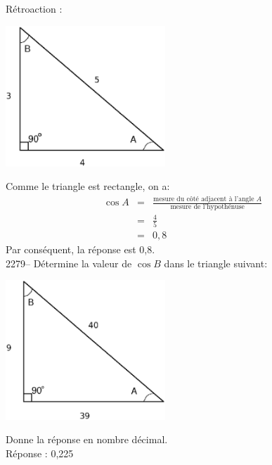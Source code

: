 \documentclass[letterpaper, 12pt]{article}
\begin{document}
R\'etroaction :\\
\begin{center}
 \includegraphics[width=6cm,bb=14 14 445 371]{Triangle_rectangle2276.eps}
\end{center}
Comme le triangle est rectangle, on a:
\begin{eqnarray*}
 \cos{A}&=&\frac{\textrm{mesure du c\^ot\'e adjacent \`a l'angle $A$}}{\textrm{mesure de l'hypoth\'enuse}}\\
&=&\frac{4}{5}\\[2mm]
&=&0,8
\end{eqnarray*}
Par cons\'equent, la r\'eponse est 0,8.\\

2279--  D\'etermine la valeur de $\cos{B}$ dans le triangle suivant:
\begin{center}
 \includegraphics[width=6cm,bb=14 14 444 381]{Triangle_rectangle2279.eps}
\end{center}
Donne la r\'eponse en nombre d\'ecimal.\\

R\'eponse : 0,225\\
\end{document}
